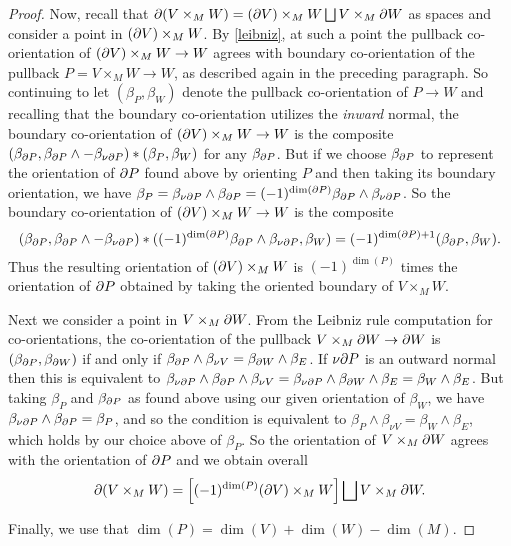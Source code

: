 \begin{proof}
	Now, recall that $\partial(V \times_M W) = (\partial V) \times_M W \bigsqcup V \times_M \partial W$ as spaces and consider a point in $(\partial V) \times_M W$.
	By \cref{leibniz}, at such a point the pullback co-orientation of $(\partial V) \times_M W \to W$ agrees with boundary co-orientation of the pullback $P = V \times_M W \to W$, as described again in the preceding paragraph.
	So continuing to let $(\beta_P,\beta_W)$ denote the pullback co-orientation of $P \to W$ and recalling that the boundary co-orientation utilizes the \textit{inward} normal, the boundary co-orientation of $(\partial V) \times_M W \to W$ is the composite $(\beta_{\partial P}, \beta_{\partial P} \wedge -\beta_{\nu\partial P})*(\beta_P,\beta_W)$ for any $\beta_{\partial P}$.
	But if we choose $\beta_{\partial P}$ to represent the orientation of $\partial P$ found above by orienting $P$ and then taking its boundary orientation, we have $\beta_P = \beta_{\nu\partial P} \wedge \beta_{\partial P} = (-1)^{\dim(\partial P)}\beta_{\partial P} \wedge \beta_{\nu\partial P}$.
	So the boundary co-orientation of $(\partial V) \times_M W \to W$ is the composite
	$$(\beta_{\partial P}, \beta_{\partial P} \wedge -\beta_{\nu\partial P})*((-1)^{\dim(\partial P)}\beta_{\partial P} \wedge \beta_{\nu\partial P},\beta_W) = (-1)^{\dim(\partial P)+1}(\beta_{\partial P},\beta_W).$$
	Thus the resulting orientation of $(\partial V) \times_M W$ is $(-1)^{\dim(P)}$ times the orientation of $\partial P$ obtained by taking the oriented boundary of $V \times_M W$.

	Next we consider a point in $V \times_M \partial W$.
	From the Leibniz rule computation for co-orientations, the co-orientation of the pullback $V \times_M \partial W \to \partial W$ is $(\beta_{\partial P},\beta_{\partial W})$ if and only if $\beta_{\partial P} \wedge \beta_{\nu V} = \beta_{\partial W} \wedge \beta_E$.
	If $\nu\partial P$ is an outward normal then this is equivalent to $\beta_{\nu\partial P} \wedge \beta_{\partial P} \wedge \beta_{\nu V} = \beta_{\nu\partial P} \wedge \beta_{\partial W} \wedge \beta_E = \beta_W \wedge \beta_E$.
	But taking $\beta_P$ and $\beta_{\partial P}$ as found above using our given orientation of $\beta_W$, we have $\beta_{\nu\partial P} \wedge \beta_{\partial P} = \beta_P$, and so the condition is equivalent to $\beta_{P} \wedge \beta_{\nu V} = \beta_W \wedge \beta_E$, which holds by our choice above of $\beta_P$.
	So the orientation of $V \times_M \partial W$ agrees with the orientation of $\partial P$ and we obtain overall
	$$\partial(V \times_M W) = \left[(-1)^{\dim(P)} (\partial V) \times_M W\right] \bigsqcup V \times_M \partial W.$$

	Finally, we use that $\dim(P) = \dim(V)+\dim(W)-\dim(M)$.
\end{proof}

